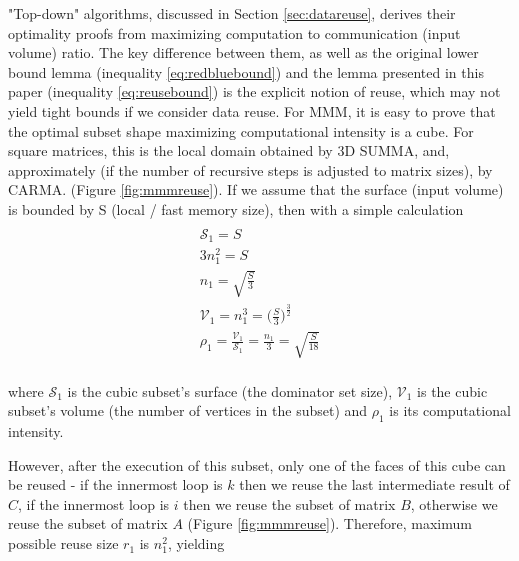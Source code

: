 \documentclass[sigplan,review,anonymous]{acmart}\settopmatter{printfolios=true,printccs=false,printacmref=false}
\begin{document}
"Top-down" algorithms, discussed in Section \ref{sec:datareuse}, derives their 
optimality proofs from maximizing computation to communication (input volume) 
ratio.
The key difference between them, as well as the original lower bound lemma 
(inequality 
\ref{eq:redbluebound}) and the lemma presented in this paper (inequality 
\ref{eq:reusebound}) is the explicit notion of reuse,  which may not yield 
tight 
bounds if we 
consider data reuse.
For MMM, it is easy to prove that 
the optimal subset shape maximizing computational intensity is a cube. For 
square matrices, this is the local domain obtained by 3D SUMMA, and, 
approximately (if the number of recursive steps is adjusted to matrix sizes), 
by CARMA.
(Figure \ref{fig:mmmreuse}). If we assume that the surface (input volume) is 
bounded by S (local / fast memory size), 
then 
with a simple calculation	
\begin{multline}
\label{eq:cubic}
\\
\mathcal{S}_1 = S \\
3 n_1^2 = S \\
n_1 = \sqrt{\frac{S}{3}} \\
\mathcal{V}_1 = n_1^3 = \Big(\frac{S}{3}\Big)^{\frac{3}{2}} \\
\rho_1 = \frac{\mathcal{V}_1}{\mathcal{S}_1} = \frac{n_1}{3} = 
\sqrt{\frac{S}{18}}\\
\end{multline}

where $\mathcal{S}_1$ is the cubic subset's surface (the dominator set 
size), 
$\mathcal{V}_1$ is the cubic subset's volume (the number of vertices in 
the 
subset) and $\rho_1$ is its computational intensity.

However, after the execution of this subset, only one of the faces of 
this cube can be reused - if the innermost loop is $k$ then we reuse the 
last intermediate result of $C$, if the innermost loop is $i$ then we reuse 
the subset of matrix $B$, otherwise we reuse the subset of matrix $A$ 
(Figure \ref{fig:mmmreuse}). Therefore, maximum possible reuse size $r_1$ 
is 
$n_1^2$, yielding 
\end{document}
